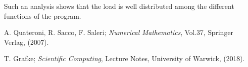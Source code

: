 \documentclass[11pt]{article}
\theoremstyle{theorem}
\theoremstyle{definition}
\begin{document}
Such an analysis shows that the load is well distributed among the different functions of the program.\\



\cleardoublepage
\begin{thebibliography}{99}

 A. Quateroni, R. Sacco, F. Saleri;
\emph{Numerical Mathematics}, Vol.37, Springer Verlag, (2007).

 T. Grafke;
\emph{Scientific Computing}, Lecture Notes, University of Warwick, (2018).







\printindex
\end{thebibliography}
\end{document}
